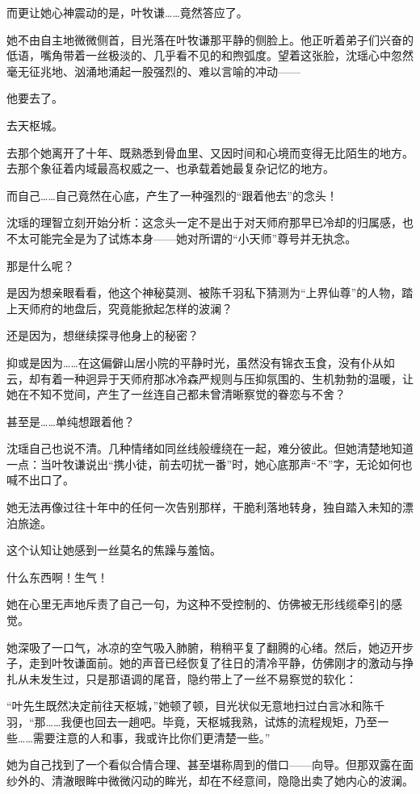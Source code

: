 而更让她心神震动的是，叶牧谦……竟然答应了。

她不由自主地微微侧首，目光落在叶牧谦那平静的侧脸上。他正听着弟子们兴奋的低语，嘴角带着一丝极淡的、几乎看不见的和煦弧度。望着这张脸，沈瑶心中忽然毫无征兆地、汹涌地涌起一股强烈的、难以言喻的冲动——

他要去了。

去天枢城。

去那个她离开了十年、既熟悉到骨血里、又因时间和心境而变得无比陌生的地方。去那个象征着内域最高权威之一、也承载着她最复杂记忆的地方。

而自己……自己竟然在心底，产生了一种强烈的“跟着他去”的念头！

沈瑶的理智立刻开始分析：这念头一定不是出于对天师府那早已冷却的归属感，也不太可能完全是为了试炼本身——她对所谓的“小天师”尊号并无执念。

那是什么呢？

是因为想亲眼看看，他这个神秘莫测、被陈千羽私下猜测为“上界仙尊”的人物，踏上天师府的地盘后，究竟能掀起怎样的波澜？

还是因为，想继续探寻他身上的秘密？

抑或是因为……在这偏僻山居小院的平静时光，虽然没有锦衣玉食，没有仆从如云，却有着一种迥异于天师府那冰冷森严规则与压抑氛围的、生机勃勃的温暖，让她在不知不觉间，产生了一丝连自己都未曾清晰察觉的眷恋与不舍？

甚至是……单纯想跟着他？

沈瑶自己也说不清。几种情绪如同丝线般缠绕在一起，难分彼此。但她清楚地知道一点：当叶牧谦说出“携小徒，前去叨扰一番”时，她心底那声“不”字，无论如何也喊不出口了。

她无法再像过往十年中的任何一次告别那样，干脆利落地转身，独自踏入未知的漂泊旅途。

这个认知让她感到一丝莫名的焦躁与羞恼。

什么东西啊！生气！

她在心里无声地斥责了自己一句，为这种不受控制的、仿佛被无形线缆牵引的感觉。

她深吸了一口气，冰凉的空气吸入肺腑，稍稍平复了翻腾的心绪。然后，她迈开步子，走到叶牧谦面前。她的声音已经恢复了往日的清冷平静，仿佛刚才的激动与挣扎从未发生过，只是那语调的尾音，隐约带上了一丝不易察觉的软化：

“叶先生既然决定前往天枢城，”她顿了顿，目光状似无意地扫过白言冰和陈千羽，“那……我便也回去一趟吧。毕竟，天枢城我熟，试炼的流程规矩，乃至一些……需要注意的人和事，我或许比你们更清楚一些。”

她为自己找到了一个看似合情合理、甚至堪称周到的借口——向导。但那双露在面纱外的、清澈眼眸中微微闪动的眸光，却在不经意间，隐隐出卖了她内心的波澜。

